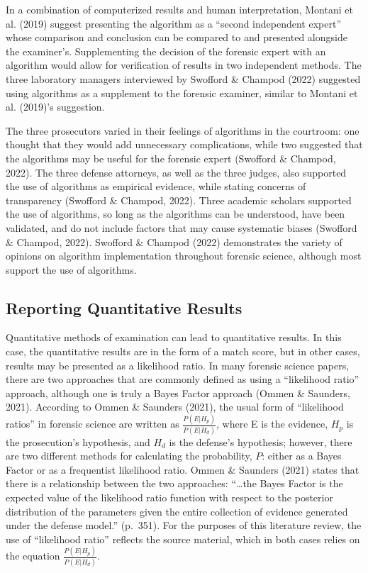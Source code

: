 \documentclass[print]{nuthesis}
\begin{document}
In a combination of computerized results and human interpretation, Montani et al. (2019) suggest presenting the algorithm as a ``second independent expert'' whose comparison and conclusion can be compared to and presented alongside the examiner's.
Supplementing the decision of the forensic expert with an algorithm would allow for verification of results in two independent methods.
The three laboratory managers interviewed by Swofford \& Champod (2022) suggested using algorithms as a supplement to the forensic examiner, similar to Montani et al. (2019)'s suggestion.

The three prosecutors varied in their feelings of algorithms in the courtroom: one thought that they would add unnecessary complications, while two suggested that the algorithms may be useful for the forensic expert (Swofford \& Champod, 2022).
The three defense attorneys, as well as the three judges, also supported the use of algorithms as empirical evidence, while stating concerns of transparency (Swofford \& Champod, 2022).
Three academic scholars supported the use of algorithms, so long as the algorithms can be understood, have been validated, and do not include factors that may cause systematic biases (Swofford \& Champod, 2022).
Swofford \& Champod (2022) demonstrates the variety of opinions on algorithm implementation throughout forensic science, although most support the use of algorithms.

\hypertarget{reporting-quantitative-results}{%
\subsection{Reporting Quantitative Results}\label{reporting-quantitative-results}}

Quantitative methods of examination can lead to quantitative results.
In this case, the quantitative results are in the form of a match score, but in other cases, results may be presented as a likelihood ratio.
In many forensic science papers, there are two approaches that are commonly defined as using a ``likelihood ratio'' approach, although one is truly a Bayes Factor approach (Ommen \& Saunders, 2021).
According to Ommen \& Saunders (2021), the usual form of ``likelihood ratios'' in forensic science are written as \(\frac{P(E|H_p)}{P(E|H_d)}\), where E is the evidence, \(H_p\) is the prosecution's hypothesis, and \(H_d\) is the defense's hypothesis; however, there are two different methods for calculating the probability, \(P\): either as a Bayes Factor or as a frequentist likelihood ratio.
Ommen \& Saunders (2021) states that there is a relationship between the two approaches: ``\ldots the Bayes Factor is the expected value of the likelihood ratio function with respect to the posterior distribution of the parameters given the entire collection of evidence generated under the defense model.'' (p.~351).
For the purposes of this literature review, the use of ``likelihood ratio'' reflects the source material, which in both cases relies on the equation \(\frac{P(E|H_p)}{P(E|H_d)}\).
\end{document}

